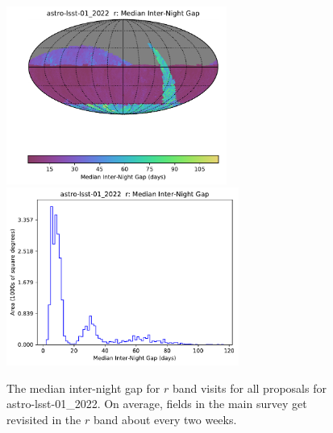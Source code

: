 \documentclass[DM,authoryear,toc]{lsstdoc}
\begin{document}
\begin{figure}[htb]
\centering
\vskip -0.0in
\includegraphics[height=2.3in]{figures/astro-lsst-01_2022_Median_Inter-Night_Gap_r_HEAL_SkyMap.pdf}
\includegraphics[height=2.3in]{figures/astro-lsst-01_2022_Median_Inter-Night_Gap_r_HEAL_Histogram.pdf}
\vskip -0.1in
\caption{The median inter-night gap for $r$ band visits for all proposals for astro-lsst-01\_2022.
On average, fields in the main survey get revisited in the $r$ band about every two weeks.}
\label{fig:baseline_Gapr}
\end{figure}
\end{document}
